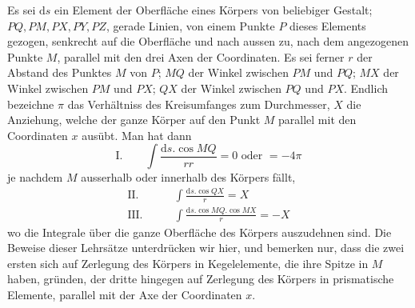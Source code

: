Es sei $\mathrm{d}s$ ein Element der Oberfläche eines Körpers von beliebiger Gestalt; $PQ,PM,PX,PY,PZ$, gerade Linien, von einem Punkte $P$ dieses Elements gezogen, senkrecht auf die Oberfläche und nach aussen zu, nach dem angezogenen Punkte $M$, parallel mit den drei Axen der Coordinaten. Es sei ferner $r$ der Abstand des Punktes $M$ von $P$; $MQ$ der Winkel zwischen $PM$ und $PQ$; $MX$ der Winkel zwischen $PM$ und $PX$; $QX$ der Winkel zwischen $PQ$ und $PX$. Endlich bezeichne $\pi$ das Verhältniss des Kreisumfanges zum Durchmesser, $X$ die Anziehung, welche der ganze Körper auf den Punkt $M$ parallel mit den Coordinaten $x$ ausübt. Man hat dann
\[
\text{I.}\qquad \int\frac{\mathrm{d}s.\cos MQ}{rr}=0\text{ oder }=-4\pi
\]
je nachdem $M$ ausserhalb oder innerhalb des Körpers fällt,
\[
\begin{aligned}
\text{II.}\qquad &\int\frac{\mathrm{d}s.\cos QX}{r}=X\\
\text{III.}\qquad &\int\frac{\mathrm{d}s.\cos MQ.\cos MX}{r}=-X
\end{aligned}
\]
wo die Integrale über die ganze Oberfläche des Körpers auszudehnen sind. Die Beweise dieser Lehrsätze unterdrücken wir hier, und bemerken nur, dass die zwei ersten sich auf Zerlegung des Körpers in Kegelelemente, die ihre Spitze in $M$ haben, gründen, der dritte hingegen auf Zerlegung des Körpers in prismatische Elemente, parallel mit der Axe der Coordinaten $x$.

